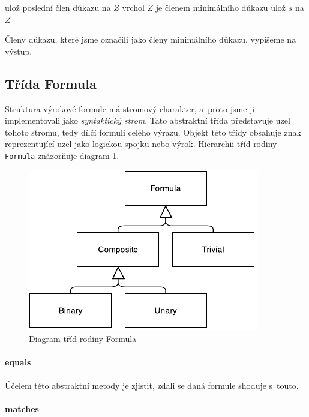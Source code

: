 \documentclass[thesis=B,czech,hidelinks]{thesis}[2012/06/26]
\begin{document}
\begin{algorithm}
ulož poslední člen důkazu na $Z$\;
{
	vrchol $Z$ je členem minimálního důkazu\;
	{
		ulož $s$ na $Z$\;
	}
}
\end{algorithm}

Členy důkazu, které jsme označili jako členy minimálního důkazu, vypíšeme na výstup.

\subsection{Třída Formula}

Struktura výrokové formule má stromový charakter, a~proto jsme ji implementovali jako \emph{syntaktický strom}. Tato abstraktní třída představuje uzel tohoto stromu, tedy dílčí formuli celého výrazu. Objekt této třídy obsahuje znak reprezentující uzel jako logickou spojku nebo výrok. Hierarchii tříd rodiny \texttt{Formula} znázorňuje diagram \ref{fig:formula}.

\begin{figure}
\centering
\caption{Diagram tříd rodiny Formula}
\label{fig:formula}
\includegraphics{diagrams/formula}
\end{figure}

\paragraph{equals}

Účelem této abstraktní metody je zjistit, zdali se daná formule shoduje s~touto.

\paragraph{matches}
\end{document}
